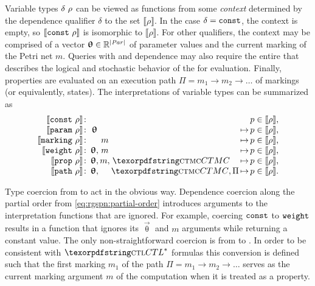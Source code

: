 Variable types \(\delta\ \rho\) can be viewed as functions from some \emph{context} determined by the dependence qualifier \(\delta\) to the set \(\llbracket \rho \rrbracket\). In the case \(\delta = \texttt{\upshape const}\), the context is empty, so \(\llbracket \texttt{\upshape const}\ \rho \rrbracket\) is isomorphic to \(\llbracket \rho \rrbracket\). For other qualifiers, the context may be comprised of a vector \(\bm{\mathrm{\uptheta}} \in \mathbb{R}^{\lvert \textrm{\itshape Par\/} \rvert}\) of parameter values and the current marking of the Petri net \(m\). Queries with  and  dependence may also require the entire  that describes the logical and stochastic behavior of the  for evaluation. Finally,  properties are evaluated on an execution path \(\Pi = m_1 \to m_2 \to \ldots\) of markings (or equivalently,  states). The interpretations of variable types can be summarized as
\begin{equation}
  \begin{array}{@{}r@{\,}c@{\,}c@{\,}c@{\,}c@{\,}l@{\,}c@{}}
    \llbracket \vartype{\lit{const}}{\rho} \rrbracket \colon& & & & & &p \in \llbracket \rho \rrbracket \text, \\
    \llbracket \vartype{\lit{param}}{\rho} \rrbracket \colon& \vec{\uptheta} & & & & \mapsto &p \in \llbracket \rho \rrbracket \text, \\
    \llbracket \vartype{\lit{marking}}{\rho} \rrbracket \colon& & m & & & \mapsto &p \in \llbracket \rho \rrbracket \text, \\
    \llbracket \vartype{\lit{weight}}{\rho} \rrbracket \colon& \vec{\uptheta}, & m & & & \mapsto &p \in \llbracket \rho \rrbracket \text, \\
    \llbracket \vartype{\lit{prop}}{\rho} \rrbracket \colon& \vec{\uptheta}, & m, & \textabbr{CTMC} & & \mapsto &p \in \llbracket \rho \rrbracket \text, \\
    \llbracket \vartype{\lit{path}}{\rho} \rrbracket \colon& \vec{\uptheta}, & & \textabbr{CTMC}, & \Pi & \mapsto &p \in \llbracket \rho \rrbracket \text. \\
  \end{array}
\end{equation}

Type coercion from  to  act in the obvious way. Dependence coercion along the partial order from \vref{eq:rgspn:partial-order} introduces arguments to the interpretation functions that are ignored. For example, coercing \(\texttt{\upshape const}\) to \(\texttt{\upshape weight}\) results in a function that ignores its \(\vec{\uptheta}\) and \(m\) arguments while returning a constant value. The only non-straightforward coercion is from  to . In order to be consistent with \(\textabbr{CTL}^*\) formulas this conversion is defined such that the first marking \(m_1\) of the path \(\Pi = m_1 \to m_2 \to \ldots\) serves as the current marking argument \(m\) of the  computation when it is treated as a  property.

